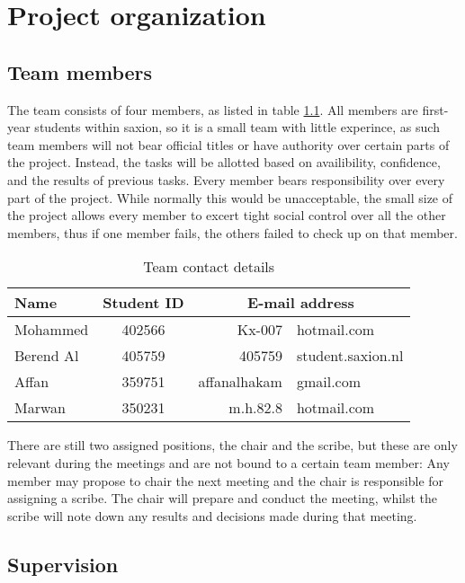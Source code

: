 \chapter{Project organization}

\section{Team members}

The team consists of four members, as listed in table \ref{tbl:contactdetails}. All members are first-year students within saxion, so it is a small team with little experince, as such team members will not bear official titles or have authority over certain parts of the project. Instead, the tasks will be allotted based on availibility, confidence, and the results of previous tasks. Every member bears responsibility over every part of the project. While normally this would be unacceptable, the small size of the project allows every member to excert tight social control over all the other members, thus if one member fails, the others failed to check up on that member.

\begin{table}
\centering
\caption{Team contact details}
\begin{tabular}{lc r @{@} l}
\\
Name & Student ID & \multicolumn{2}{c}{E-mail address} \\
\hline
Mohammed & 402566 & Kx-007&hotmail.com \\
Berend Al & 405759 & 405759&student.saxion.nl \\
Affan & 359751 & affanalhakam&gmail.com \\
Marwan & 350231 & m.h.82.8&hotmail.com \\
\end{tabular}
\label{tbl:contactdetails}
\end{table}

There are still two assigned positions, the chair and the scribe, but these are only relevant during the meetings and are not bound to a certain team member: Any member may propose to chair the next meeting and the chair is responsible for assigning a scribe. The chair will prepare and conduct the meeting, whilst the scribe will note down any results and decisions made during that meeting.

\section{Supervision}

